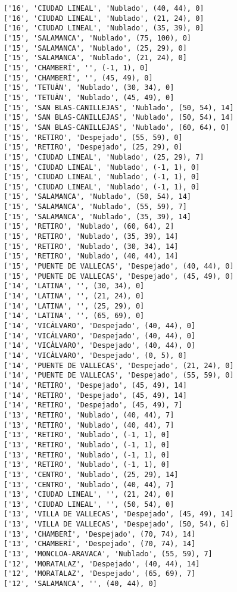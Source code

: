 \documentclass[11pt]{article}
\begin{document}
\begin{Verbatim}[commandchars=\\\{\}]
['16', 'CIUDAD LINEAL', 'Nublado', (40, 44), 0]
['16', 'CIUDAD LINEAL', 'Nublado', (21, 24), 0]
['16', 'CIUDAD LINEAL', 'Nublado', (35, 39), 0]
['15', 'SALAMANCA', 'Nublado', (75, 100), 0]
['15', 'SALAMANCA', 'Nublado', (25, 29), 0]
['15', 'SALAMANCA', 'Nublado', (21, 24), 0]
['15', 'CHAMBERÍ', '', (-1, 1), 0]
['15', 'CHAMBERÍ', '', (45, 49), 0]
['15', 'TETUÁN', 'Nublado', (30, 34), 0]
['15', 'TETUÁN', 'Nublado', (45, 49), 0]
['15', 'SAN BLAS-CANILLEJAS', 'Nublado', (50, 54), 14]
['15', 'SAN BLAS-CANILLEJAS', 'Nublado', (50, 54), 14]
['15', 'SAN BLAS-CANILLEJAS', 'Nublado', (60, 64), 0]
['15', 'RETIRO', 'Despejado', (55, 59), 0]
['15', 'RETIRO', 'Despejado', (25, 29), 0]
['15', 'CIUDAD LINEAL', 'Nublado', (25, 29), 7]
['15', 'CIUDAD LINEAL', 'Nublado', (-1, 1), 0]
['15', 'CIUDAD LINEAL', 'Nublado', (-1, 1), 0]
['15', 'CIUDAD LINEAL', 'Nublado', (-1, 1), 0]
['15', 'SALAMANCA', 'Nublado', (50, 54), 14]
['15', 'SALAMANCA', 'Nublado', (55, 59), 7]
['15', 'SALAMANCA', 'Nublado', (35, 39), 14]
['15', 'RETIRO', 'Nublado', (60, 64), 2]
['15', 'RETIRO', 'Nublado', (35, 39), 14]
['15', 'RETIRO', 'Nublado', (30, 34), 14]
['15', 'RETIRO', 'Nublado', (40, 44), 14]
['15', 'PUENTE DE VALLECAS', 'Despejado', (40, 44), 0]
['15', 'PUENTE DE VALLECAS', 'Despejado', (45, 49), 0]
['14', 'LATINA', '', (30, 34), 0]
['14', 'LATINA', '', (21, 24), 0]
['14', 'LATINA', '', (25, 29), 0]
['14', 'LATINA', '', (65, 69), 0]
['14', 'VICÁLVARO', 'Despejado', (40, 44), 0]
['14', 'VICÁLVARO', 'Despejado', (40, 44), 0]
['14', 'VICÁLVARO', 'Despejado', (40, 44), 0]
['14', 'VICÁLVARO', 'Despejado', (0, 5), 0]
['14', 'PUENTE DE VALLECAS', 'Despejado', (21, 24), 0]
['14', 'PUENTE DE VALLECAS', 'Despejado', (55, 59), 0]
['14', 'RETIRO', 'Despejado', (45, 49), 14]
['14', 'RETIRO', 'Despejado', (45, 49), 14]
['14', 'RETIRO', 'Despejado', (45, 49), 7]
['13', 'RETIRO', 'Nublado', (40, 44), 7]
['13', 'RETIRO', 'Nublado', (40, 44), 7]
['13', 'RETIRO', 'Nublado', (-1, 1), 0]
['13', 'RETIRO', 'Nublado', (-1, 1), 0]
['13', 'RETIRO', 'Nublado', (-1, 1), 0]
['13', 'RETIRO', 'Nublado', (-1, 1), 0]
['13', 'CENTRO', 'Nublado', (25, 29), 14]
['13', 'CENTRO', 'Nublado', (40, 44), 7]
['13', 'CIUDAD LINEAL', '', (21, 24), 0]
['13', 'CIUDAD LINEAL', '', (50, 54), 0]
['13', 'VILLA DE VALLECAS', 'Despejado', (45, 49), 14]
['13', 'VILLA DE VALLECAS', 'Despejado', (50, 54), 6]
['13', 'CHAMBERÍ', 'Despejado', (70, 74), 14]
['13', 'CHAMBERÍ', 'Despejado', (70, 74), 14]
['13', 'MONCLOA-ARAVACA', 'Nublado', (55, 59), 7]
['12', 'MORATALAZ', 'Despejado', (40, 44), 14]
['12', 'MORATALAZ', 'Despejado', (65, 69), 7]
['12', 'SALAMANCA', '', (40, 44), 0]

\end{Verbatim}
\end{document}
